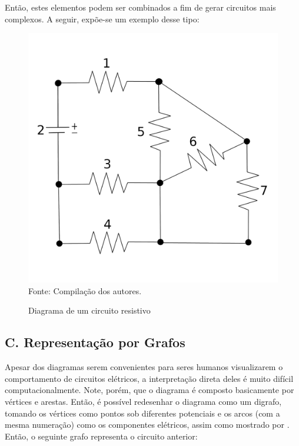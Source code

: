 \documentclass[twocolumn, 10pt,a4paper]{extarticle}
\begin{document}
Então, estes elementos podem ser combinados a fim de gerar circuitos mais complexos. A seguir, expõe-se um exemplo desse tipo:

\begin{figure}[H]
	\caption{Diagrama de um circuito resistivo} 
	\centering
	\includegraphics[scale=0.35]{circ1}
	\\ Fonte: Compilação dos autores.
\end{figure}


\subsection*{C. \quad Representação por Grafos}

Apesar dos diagramas serem convenientes para seres humanos visualizarem o comportamento de circuitos elétricos, a interpretação direta deles é muito difícil computacionalmente. Note, porém, que o diagrama é composto basicamente por vértices e arestas. Então, é possível redesenhar o diagrama como um digrafo, tomando os vértices como pontos sob diferentes potenciais e os arcos (com a mesma numeração) como os componentes elétricos, assim como mostrado por \cite[p. 838]{krishna}. Então, o seguinte grafo representa o circuito anterior:
\end{document}
